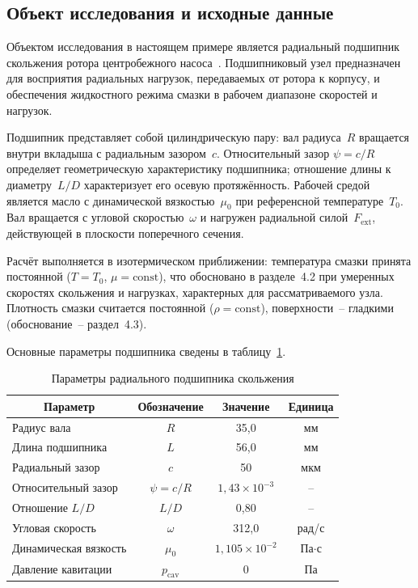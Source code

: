 \subsection{Объект исследования и исходные данные}

Объектом исследования в настоящем примере является радиальный
подшипник скольжения ротора центробежного насоса~\cite{bashmur2024a}.
Подшипниковый узел предназначен для восприятия радиальных
нагрузок, передаваемых от ротора к корпусу, и обеспечения
жидкостного режима смазки в рабочем диапазоне скоростей
и нагрузок.

Подшипник представляет собой цилиндрическую пару: вал
радиуса~$R$ вращается внутри вкладыша с радиальным зазором~$c$.
Относительный зазор $\psi = c/R$ определяет геометрическую
характеристику подшипника; отношение длины к диаметру~$L/D$
характеризует его осевую протяжённость. Рабочей средой является
масло с динамической вязкостью~$\mu_0$ при референсной
температуре~$T_0$. Вал вращается с угловой скоростью~$\omega$
и нагружен радиальной силой~$F_{\mathrm{ext}}$, действующей
в плоскости поперечного сечения.

Расчёт выполняется в изотермическом приближении: температура
смазки принята постоянной ($T = T_0$, $\mu = \mathrm{const}$),
что обосновано в разделе~4.2 при умеренных скоростях скольжения
и нагрузках, характерных для рассматриваемого узла. Плотность
смазки считается постоянной ($\rho = \mathrm{const}$),
поверхности~-- гладкими (обоснование~-- раздел~4.3).

Основные параметры подшипника сведены в таблицу~\ref{tab:journal_params}.

\begin{table}[!ht]
\centering
\caption{Параметры радиального подшипника скольжения}
\label{tab:journal_params}
\begin{tabularx}{\textwidth}{|X|c|c|c|}
\hline
\multicolumn{1}{|c|}{\textbf{Параметр}} & \textbf{Обозначение} & \textbf{Значение} & \textbf{Единица} \\
\hline
Радиус вала            & $R$              & 35{,}0  & мм \\
\hline
Длина подшипника       & $L$              & 56{,}0  & мм \\
\hline
Радиальный зазор       & $c$              & 50      & мкм \\
\hline
Относительный зазор    & $\psi = c/R$     & $1{,}43 \times 10^{-3}$ & -- \\
\hline
Отношение $L/D$        & $L/D$            & 0{,}80  & -- \\
\hline
Угловая скорость       & $\omega$         & 312{,}0 & рад/с \\
\hline
Динамическая вязкость  & $\mu_0$          & $1{,}105 \times 10^{-2}$ & Па$\cdot$с \\
\hline
Давление кавитации     & $p_{\mathrm{cav}}$ & 0     & Па \\
\hline
\end{tabularx}
\end{table}

